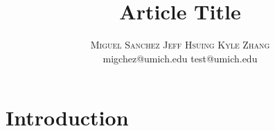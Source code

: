 \documentclass[twoside]{article}
\title{\vspace{-15mm}\fontsize{24pt}{10pt}\selectfont\textbf{Article Title}} %
\author{
\large
\textsc{Miguel Sanchez Jeff Hsuing Kyle Zhang}\\
\normalsize migchez@umich.edu test@umich.edu %
\vspace{-5mm}
}
\date{}
\begin{document}
\maketitle %


\begin{abstract}

\noindent \lipsum[1] %

\end{abstract}


\section{Introduction}
\end{document}
